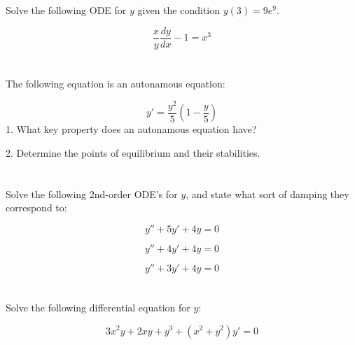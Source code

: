 \section{}

Solve the following ODE for $y$ given the condition $y(3)=9e^9$.

\begin{equation}
    \frac{x}{y} \frac{dy}{dx} - 1 = x^3
\end{equation}




\section{}

The following equation is an autonamous equation:

\begin{equation}
    y'=\frac{y^2}{5}(1-\frac{y}{5})
\end{equation}
1. What key property does an autonamous equation have?

2. Determine the points of equilibrium and their stabilities.





\section{}

Solve the following 2nd-order ODE's for $y$, and state what sort of damping they correspond to:

\begin{equation}
    y'' + 5 y' + 4y = 0 %
\end{equation}

\begin{equation}
    y'' + 4 y' + 4 y = 0 %
\end{equation}

\begin{equation}
    y'' + 3 y' + 4 y = 0 %
\end{equation}




\section{}

Solve the following differential equation for $y$:

\begin{equation}
    3 x^2 y + 2 x y + y^3 + (x^2 + y^2) y' = 0
\end{equation}
